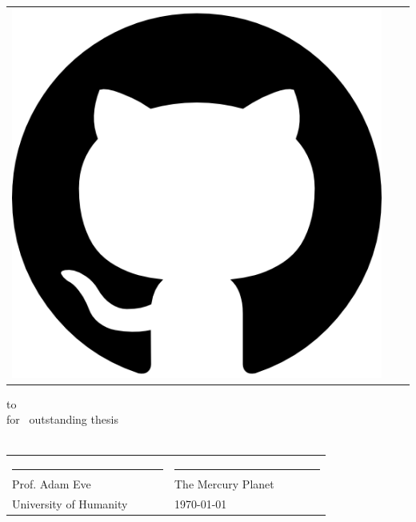 {{\begin{minipage}{.33\textwidth}
{\begin{minipage}{0.9\textwidth}
\begin{tabular}{clc}
\begin{minipage}{.12\textwidth}
\includegraphics[width=1\columnwidth]{github.png}          
\end{minipage}   
\\
\end{tabular}
\end{minipage}

\vspace{1mm}
\begin{minipage}{0.8\textwidth}
\centering
\textcolor{black!100!black!80}{
 to {\calligra \Name}  \\[2mm] \textcolor{black!100!black!80}{\tiny for \Gender~outstanding thesis } \\ 
[2mm]
                                  \tiny \textbf{\somemagiccommand{\Titel}}     \\
}
\end{minipage}   

\vspace{6mm}
\centering
\begin{minipage}{.9\textwidth}
\textcolor{black!100!black!80}{
\begin{tabular}{p{4.7cm} p{6cm}}
\tiny \uline{~~~~~~~~~~~~~~~~~~~~~~~~~~~} & \tiny \uline{~~~~~~~~~~~~~~~~~~~~~~~~~~}  \\
\tiny Prof. Adam Eve                 &      \tiny The Mercury Planet           \\
\tiny University of Humanity           &      \tiny \today                        \\
\end{tabular}}
\end{minipage}   
}
\end{minipage}
}}

